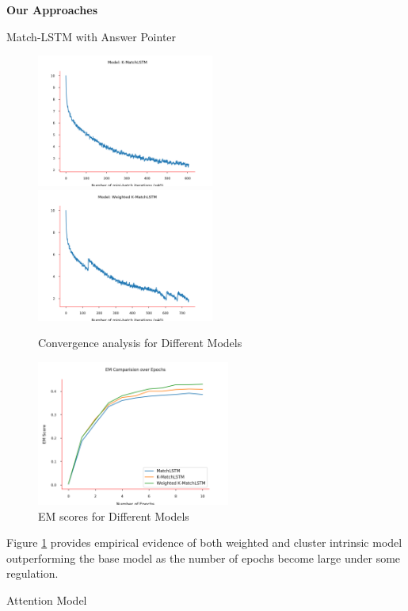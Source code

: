 \documentclass{article}
\begin{document}
\begin{psection}{\textbf{Our Approaches}}
\begin{psubsection}{Match-LSTM with Answer Pointer}
    \begin{figure}[ht!]
		\centering
	    \includegraphics[trim={0 4mm 0   0},clip,width=220px]{includes/plots/match-lstm/loss-k-match-lstm.png}
	    \hspace{5mm}
	    \includegraphics[trim={0 4mm 0 0},clip,width=220px]{includes/plots/match-lstm/loss-weighted-k-match-lstm.png}
		\caption{Convergence analysis for Different Models}
	\end{figure}

	\begin{figure}[ht!]
		\centering
	    \includegraphics[trim={0 4mm 0 0},clip,height=180px]{includes/plots/match-lstm/comparision.png}
		\caption{EM scores for Different Models}
		\label{em-comparison}
	\end{figure}
	Figure \ref{em-comparison} provides empirical evidence of both weighted and cluster intrinsic model outperforming the base model as the number of epochs become large under some regulation.
\end{psubsection}

\begin{psubsection}{Attention Model}


\end{psubsection}
\end{psection}
\end{document}
